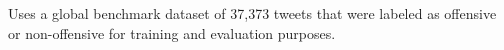 Uses a global benchmark dataset of 37,373 tweets that were labeled as offensive or non-offensive for training and evaluation purposes.
